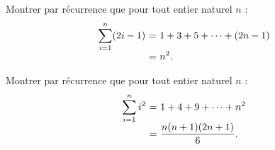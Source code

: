 
\begingroup

\begin{exercice}[Récurrence]\label{exo:introduction/maths/induction}

  \begin{questions}
  \item Montrer par récurrence que pour tout entier naturel $n$ :
    $$\begin{array}{r@{~}c@{~}l}
    \displaystyle\sum_{i=1}^n (2i-1) &=& \displaystyle 1 + 3 + 5 + \dots + (2n-1)\\
    &=& \displaystyle n^2.
    \end{array}$$
  \item Montrer par récurrence que pour tout entier naturel $n$ :
    $$\begin{array}{r@{~}c@{~}l}
    \displaystyle \sum_{i=1}^n i^2 &=& \displaystyle 1 + 4 + 9 + \dots + n^2\\
    &=& \displaystyle \frac{n(n+1)(2n+1)}{6}.
    \end{array}$$
  \end{questions}
  
\end{exercice}

